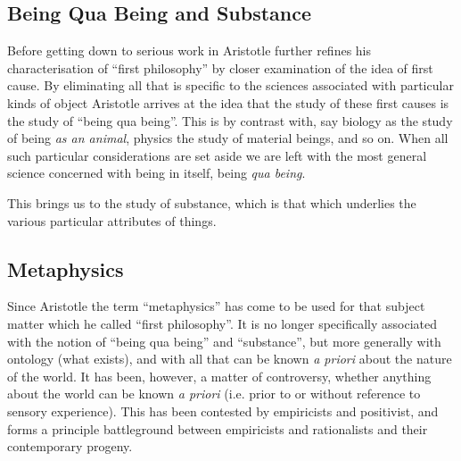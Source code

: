 \documentclass[10pt,titlepage]{article}
\begin{document}
\subsection{Being Qua Being and Substance}

Before getting down to serious work in Aristotle further refines his characterisation of ``first philosophy'' by closer examination of the idea of first cause.
By eliminating all that is specific to the sciences associated with particular kinds of object Aristotle arrives at the idea that the study of these first causes is the study of ``being qua being''.
This is by contrast with, say biology as the study of being \emph{as an animal}, physics the study of material beings, and so on.
When all such particular considerations are set aside we are left with the most general science concerned with being in itself, being \emph{qua being}.

This brings us to the study of substance, which is that which underlies the various particular attributes of things.

\subsection{Metaphysics}

Since Aristotle the term ``metaphysics'' has come to be used for that subject matter which he called ``first philosophy''.
It is no longer specifically associated with the notion of ``being qua being'' and ``substance'', but more generally with ontology (what exists), and with all that can be known \emph{a priori} about the nature of the world.
It has been, however, a matter of controversy, whether anything about the world can be known \emph{a priori} (i.e. prior to or without reference to sensory experience).
This has been contested by empiricists and positivist, and forms a principle battleground between empiricists and rationalists and their contemporary progeny.



%
%






\end{document}
